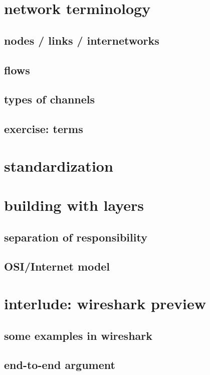 
\section{network terminology}

\subsection{nodes / links / internetworks}



\subsection{flows}



\subsection{types of channels}



\subsection{exercise: terms}


\section{standardization}


\section{building with layers}

\subsection{separation of responsibility}



\subsection{OSI/Internet model}



\section{interlude: wireshark preview}



\subsection{some examples in wireshark}


\subsection{end-to-end argument}



